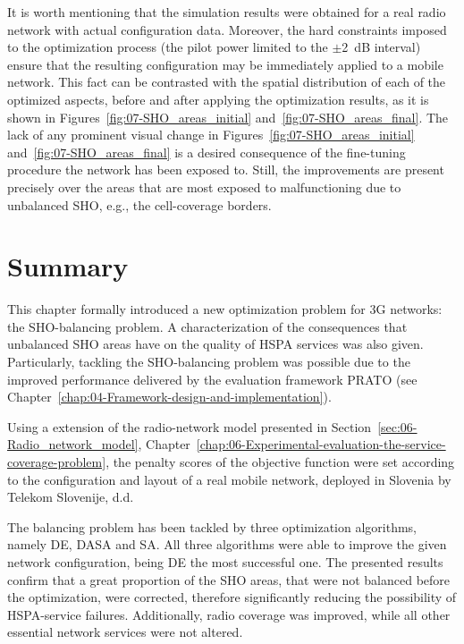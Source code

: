 It is worth mentioning that the simulation results were obtained for
a real radio network with actual configuration data. Moreover, the
hard constraints imposed to the optimization process (the pilot power
limited to the $\pm$2~dB interval) ensure that the resulting configuration
may be immediately applied to a mobile network. This fact can be contrasted
with the spatial distribution of each of the optimized aspects, before
and after applying the optimization results, as it is shown in Figures~\ref{fig:07-SHO_areas_initial}
and~\ref{fig:07-SHO_areas_final}. The lack of any prominent visual
change in Figures~\ref{fig:07-SHO_areas_initial} and~\ref{fig:07-SHO_areas_final}
is a desired consequence of the fine-tuning procedure the network
has been exposed to. Still, the improvements are present precisely
over the areas that are most exposed to malfunctioning due to unbalanced
SHO, e.g., the cell-coverage borders.

\clearpage{}


\section{Summary \label{sec:07-Summary}}

This chapter formally introduced a new optimization problem for 3G
networks: the SHO-balancing problem. A characterization of the consequences
that unbalanced SHO areas have on the quality of HSPA services was
also given. Particularly, tackling the SHO-balancing problem was possible
due to the improved performance delivered by the evaluation framework
PRATO (see Chapter~\ref{chap:04-Framework-design-and-implementation}).

\noindent Using a extension of the radio-network model presented in
Section~\ref{sec:06-Radio_network_model}, Chapter~\ref{chap:06-Experimental-evaluation-the-service-coverage-problem},
the penalty scores of the objective function were set according to
the configuration and layout of a real mobile network, deployed in
Slovenia by Telekom Slovenije, d.d. 

The balancing problem has been tackled by three optimization algorithms,
namely DE, DASA and SA. All three algorithms were able to improve
the given network configuration, being DE the most successful one.
The presented results confirm that a great proportion of the SHO areas,
that were not balanced before the optimization, were corrected, therefore
significantly reducing the possibility of HSPA-service failures. Additionally,
radio coverage was improved, while all other essential network services
were not altered.

